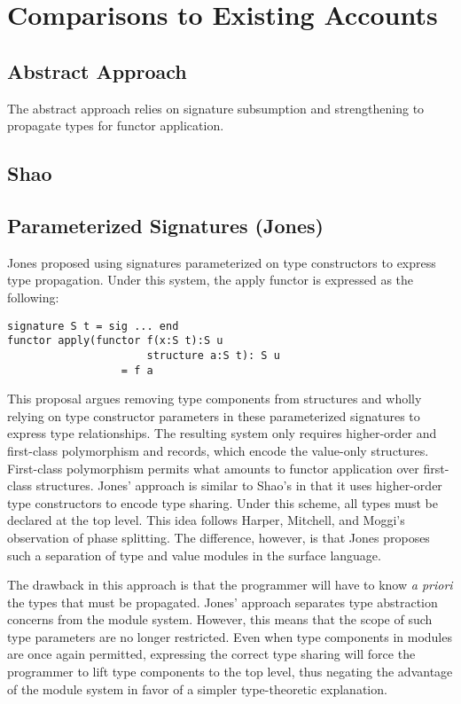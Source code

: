 


\section{Comparisons to Existing Accounts}
\subsection{Abstract Approach}
The abstract approach relies on signature subsumption and strengthening to propagate types for functor application. 

\subsection{Shao}

\subsection{Parameterized Signatures (Jones)}
Jones proposed using signatures parameterized on type constructors to express type propagation\cite{jones96}. Under this system, the apply functor is expressed as the following:
\begin{lstlisting}
signature S t = sig ... end
functor apply(functor f(x:S t):S u
                      structure a:S t): S u
                  = f a
\end{lstlisting}

This proposal argues removing type components from structures and wholly relying on type constructor parameters in these parameterized signatures to express type relationships. The resulting system only requires higher-order and first-class polymorphism and records, which encode the value-only structures. First-class polymorphism permits what amounts to functor application over first-class structures. Jones' approach is similar to Shao's in that it uses higher-order type constructors to encode type sharing. Under this scheme, all types must be declared at the top level. This idea follows Harper, Mitchell, and Moggi's observation of phase splitting\cite{hmm:phasedist}. The difference, however, is that Jones proposes such a separation of type and value modules in the surface language. 

The drawback in this approach is that the programmer will have to know \emph{a priori} the types that must be propagated. Jones' approach separates type abstraction concerns from the module system. However, this means that the scope of such type parameters are no longer restricted. Even when type components in modules are once again permitted, expressing the correct type sharing will force the programmer to lift type components to the top level, thus negating the advantage of the module system in favor of a simpler type-theoretic explanation.

